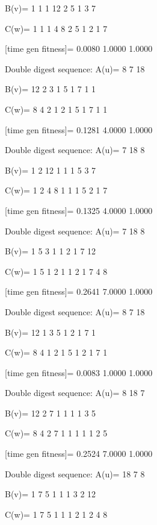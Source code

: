 B(v)=
     1     1     1    12     2     5     1     3     7

C(w)=
     1     1     1     4     8     2     5     1     2     1     7

[time gen fitness]=
    0.0080    1.0000    1.0000

Double digest sequence:
A(u)=
     8     7    18

B(v)=
    12     2     3     1     5     1     7     1     1

C(w)=
     8     4     2     1     2     1     5     1     7     1     1

[time gen fitness]=
    0.1281    4.0000    1.0000

Double digest sequence:
A(u)=
     7    18     8

B(v)=
     1     2    12     1     1     1     5     3     7

C(w)=
     1     2     4     8     1     1     1     5     2     1     7

[time gen fitness]=
    0.1325    4.0000    1.0000

Double digest sequence:
A(u)=
     7    18     8

B(v)=
     1     5     3     1     1     2     1     7    12

C(w)=
     1     5     1     2     1     1     2     1     7     4     8

[time gen fitness]=
    0.2641    7.0000    1.0000

Double digest sequence:
A(u)=
     8     7    18

B(v)=
    12     1     3     5     1     2     1     7     1

C(w)=
     8     4     1     2     1     5     1     2     1     7     1

[time gen fitness]=
    0.0083    1.0000    1.0000

Double digest sequence:
A(u)=
     8    18     7

B(v)=
    12     2     7     1     1     1     1     3     5

C(w)=
     8     4     2     7     1     1     1     1     1     2     5

[time gen fitness]=
    0.2524    7.0000    1.0000

Double digest sequence:
A(u)=
    18     7     8

B(v)=
     1     7     5     1     1     1     3     2    12

C(w)=
     1     7     5     1     1     1     2     1     2     4     8

